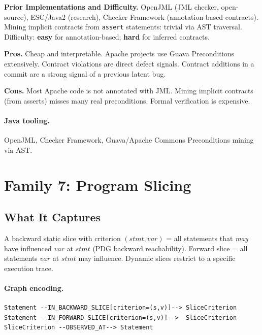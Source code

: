 \documentclass[12pt,a4paper]{article}
\begin{document}
\begin{implbox}
\textbf{Prior Implementations and Difficulty.}
OpenJML (JML checker, open-source), ESC/Java2 (research), Checker Framework
(annotation-based contracts). Mining implicit contracts from
\texttt{assert} statements: trivial via AST traversal. Difficulty:
\textbf{easy} for annotation-based; \textbf{hard} for inferred contracts.
\end{implbox}

\begin{prosbox}
\textbf{Pros.}
Cheap and interpretable. Apache projects use Guava Preconditions extensively.
Contract violations are direct defect signals. Contract additions in a commit
are a strong signal of a previous latent bug.
\end{prosbox}

\begin{consbox}
\textbf{Cons.}
Most Apache code is not annotated with JML. Mining implicit contracts
(from asserts) misses many real preconditions. Formal verification is
expensive.
\end{consbox}

\paragraph{Java tooling.} OpenJML, Checker Framework, Guava/Apache Commons
Preconditions mining via AST.

\section{Family 7: Program Slicing}

\subsection{What It Captures}

A backward static slice with criterion $(stmt, var)$ = all statements that
\emph{may} have influenced $var$ at $stmt$ (PDG backward reachability).
Forward slice = all statements $var$ at $stmt$ may influence. Dynamic slices
restrict to a specific execution trace.

\paragraph{Graph encoding.}
\begin{lstlisting}
Statement --IN_BACKWARD_SLICE[criterion=(s,v)]--> SliceCriterion
Statement --IN_FORWARD_SLICE[criterion=(s,v)]-->  SliceCriterion
SliceCriterion --OBSERVED_AT--> Statement
\end{lstlisting}
\end{document}
